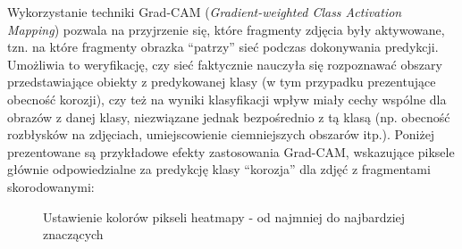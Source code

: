 \documentclass[polish,12pt]{aghthesis}
\begin{document}
\par Wykorzystanie techniki Grad-CAM (\textit{Gradient-weighted Class Activation
Mapping})\cite{gradCam} pozwala na przyjrzenie się, które fragmenty zdjęcia były aktywowane, tzn. na które fragmenty obrazka ``patrzy'' sieć podczas dokonywania predykcji. Umożliwia to weryfikację, czy sieć faktycznie nauczyła się rozpoznawać obszary przedstawiające obiekty z predykowanej klasy (w tym przypadku prezentujące obecność korozji), czy też na wyniki klasyfikacji wpływ miały cechy wspólne dla obrazów z danej klasy, niezwiązane jednak bezpośrednio z tą klasą (np. obecność rozbłysków na zdjęciach, umiejscowienie ciemniejszych obszarów itp.).
\newline Poniżej prezentowane są przykładowe efekty zastosowania Grad-CAM, wskazujące piksele głównie odpowiedzialne za predykcję klasy ``korozja'' dla zdjęć z fragmentami skorodowanymi:
\begin{figure}[H]
    \begin{adjustbox}{minipage=1.0\paperwidth, pagecenter}
    \centering
    \end{adjustbox}
    \caption{Ustawienie kolorów pikseli heatmapy - od najmniej do najbardziej znaczących}
\end{figure}
\begin{figure}[H]
    \begin{adjustbox}{minipage=1.0\paperwidth, pagecenter}
    \centering
    \qquad
    \end{adjustbox}
\end{figure}
\end{document}
